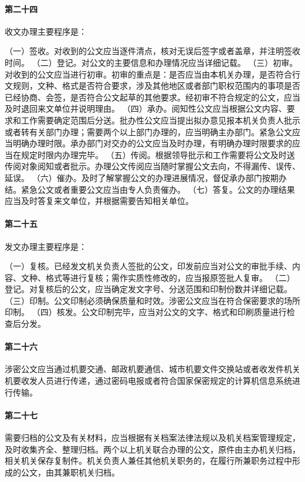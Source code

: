 \documentclass{gbt9704}
\begin{document}
\paragraph{第二十四}收文办理主要程序是：

（一）签收。对收到的公文应当逐件清点，核对无误后签字或者盖章，并注明签收时间。
（二）登记。对公文的主要信息和办理情况应当详细记载。
（三）初审。对收到的公文应当进行初审。初审的重点是：是否应当由本机关办理，是否符合行文规则，文种、格式是否符合要求，涉及其他地区或者部门职权范围内的事项是否已经协商、会签，是否符合公文起草的其他要求。经初审不符合规定的公文，应当及时退回来文单位并说明理由。
（四）承办。阅知性公文应当根据公文内容、要求和工作需要确定范围后分送。批办性公文应当提出拟办意见报本机关负责人批示或者转有关部门办理；需要两个以上部门办理的，应当明确主办部门。紧急公文应当明确办理时限。承办部门对交办的公文应当及时办理，有明确办理时限要求的应当在规定时限内办理完毕。
（五）传阅。根据领导批示和工作需要将公文及时送传阅对象阅知或者批示。办理公文传阅应当随时掌握公文去向，不得漏传、误传、延误。
（六）催办。及时了解掌握公文的办理进展情况，督促承办部门按期办结。紧急公文或者重要公文应当由专人负责催办。
（七）答复。公文的办理结果应当及时答复来文单位，并根据需要告知相关单位。
\paragraph{第二十五}发文办理主要程序是：

（一）复核。已经发文机关负责人签批的公文，印发前应当对公文的审批手续、内容、文种、格式等进行复核；需作实质性修改的，应当报原签批人复审。
（二）登记。对复核后的公文，应当确定发文字号、分送范围和印制份数并详细记载。
（三）印制。公文印制必须确保质量和时效。涉密公文应当在符合保密要求的场所印制。
（四）核发。公文印制完毕，应当对公文的文字、格式和印刷质量进行检查后分发。
\paragraph{第二十六}涉密公文应当通过机要交通、邮政机要通信、城市机要文件交换站或者收发件机关机要收发人员进行传递，通过密码电报或者符合国家保密规定的计算机信息系统进行传输。

\paragraph{第二十七}需要归档的公文及有关材料，应当根据有关档案法律法规以及机关档案管理规定，及时收集齐全、整理归档。两个以上机关联合办理的公文，原件由主办机关归档，相关机关保存复制件。机关负责人兼任其他机关职务的，在履行所兼职务过程中形成的公文，由其兼职机关归档。
\end{document}
